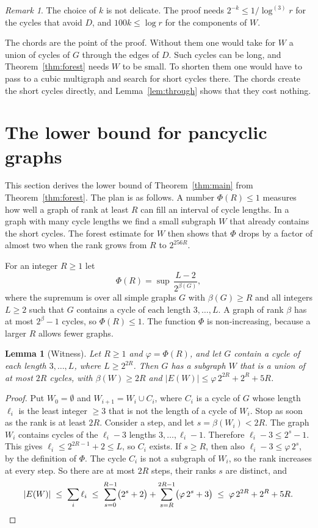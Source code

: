 \documentclass[11pt]{article}
\newtheorem{lemma}[theorem]{Lemma}
\theoremstyle{definition}
\theoremstyle{remark}
\newtheorem{remark}[theorem]{Remark}
\newcommand{\lgk}[1]{\log^{(#1)}}
\numberwithin{equation}{section}
\begin{document}
\begin{remark}\label{rem:chords}
The choice of $k$ is not delicate. The proof needs $2^{-k}\le1/\lgk3r$ for the cycles that avoid
$D$, and $100k\le\log r$ for the components of $W$.

The chords are the point of the proof. Without them one would take for $W$ a union of cycles of $G$
through the edges of $D$. Such cycles can be long, and Theorem~\ref{thm:forest} needs $W$ to be
small. To shorten them one would have to pass to a cubic multigraph and search for short cycles
there. The chords create the short cycles directly, and Lemma~\ref{lem:through} shows that they cost
nothing.
\end{remark}
\section{The lower bound for pancyclic graphs}\label{sec:lower}

This section derives the lower bound of Theorem~\ref{thm:main} from Theorem~\ref{thm:forest}. The
plan is as follows. A number $\Phi(R)\le1$ measures how well a graph of rank at least $R$ can fill
an interval of cycle lengths. In a graph with many cycle lengths we find a small subgraph $W$ that
already contains the short cycles. The forest estimate for $W$ then shows that $\Phi$ drops by a
factor of almost two when the rank grows from $R$ to $2^{256R}$.

For an integer $R\ge1$ let
\[
  \Phi(R)=\sup\,\frac{L-2}{2^{\beta(G)}} ,
\]
where the supremum is over all simple graphs $G$ with $\beta(G)\ge R$ and all integers $L\ge2$ such
that $G$ contains a cycle of each length $3,\dots,L$. A graph of rank $\beta$ has at most
$2^{\beta}-1$ cycles, so $\Phi(R)\le1$. The function $\Phi$ is non-increasing, because a larger $R$
allows fewer graphs.

\begin{lemma}[Witness]\label{lem:witness}
Let $R\ge1$ and $\varphi=\Phi(R)$, and let $G$ contain a cycle of each length $3,\dots,L$, where
$L\ge2^{2R}$. Then $G$ has a subgraph $W$ that is a union of at most $2R$ cycles, with
$\beta(W)\ge2R$ and $|E(W)|\le\varphi\,2^{2R}+2^{R}+5R$.
\end{lemma}

\begin{proof}
Put $W_0=\emptyset$ and $W_{i+1}=W_i\cup C_i$, where $C_i$ is a cycle of $G$ whose length $\ell_i$ is
the least integer $\ge3$ that is not the length of a cycle of $W_i$. Stop as soon as the rank is at
least $2R$. Consider a step, and let $s=\beta(W_i)<2R$. The graph $W_i$ contains cycles of the
$\ell_i-3$ lengths $3,\dots,\ell_i-1$. Therefore $\ell_i-3\le2^{s}-1$. This gives
$\ell_i\le2^{2R-1}+2\le L$, so $C_i$ exists. If $s\ge R$, then also $\ell_i-3\le\varphi\,2^{s}$, by
the definition of $\Phi$. The cycle $C_i$ is not a subgraph of $W_i$, so the rank increases at every
step. So there are at most $2R$ steps, their ranks $s$ are distinct, and
\[
  |E(W)|\;\le\;\sum_i\ell_i\;\le\;\sum_{s=0}^{R-1}\bigl(2^{s}+2\bigr)+\sum_{s=R}^{2R-1}\bigl(\varphi\,2^{s}+3\bigr)
  \;\le\;\varphi\,2^{2R}+2^{R}+5R .\qedhere
\]
\end{proof}
\end{document}
